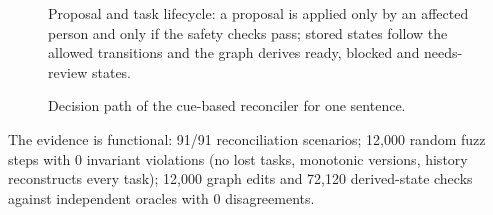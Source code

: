 \begin{figure}[htbp]
\centering
{}
\caption{Proposal and task lifecycle: a proposal is applied only by an affected person and only if the safety checks pass; stored states follow the allowed transitions and the graph derives ready, blocked and needs-review states.}
\label{fig:lifecycle}
\end{figure}


\begin{figure}[htbp]
\centering
{}
\caption{Decision path of the cue-based reconciler for one sentence.}
\label{fig:rules}
\end{figure}

The evidence is functional: 91/91 reconciliation scenarios; 12,000 random fuzz steps with 0 invariant violations (no lost tasks, monotonic versions, history reconstructs every task); 12,000 graph edits and 72,120 derived-state checks against independent oracles with 0 disagreements.
